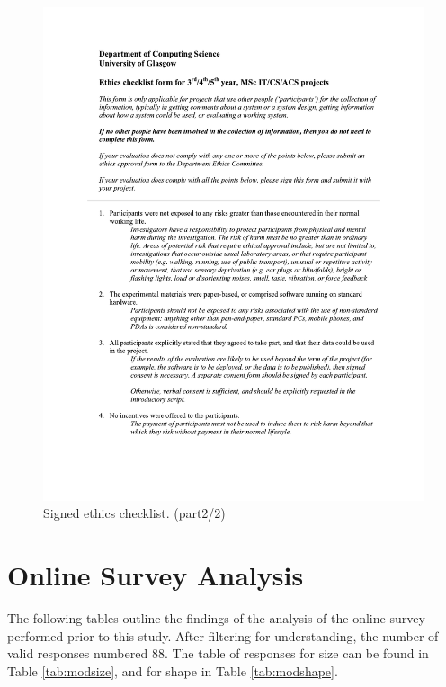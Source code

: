 \documentclass{l4proj}
\begin{document}
\begin{appendices}
\begin{figure}
    \includegraphics[page=2,width=\linewidth]{Appendices/ethics_form_KM.pdf}
    \caption{Signed ethics checklist. (part2/2)}
    \label{fig:ethics2}
\end{figure}

\newpage

\chapter{Online Survey Analysis}
\label{sec:onlineana}

The following tables outline the findings of the analysis of the online survey performed prior to this study. After filtering for understanding, the number of valid responses numbered 88. The table of responses for size can be found in Table \ref{tab:modsize}, and for shape in Table \ref{tab:modshape}.


\end{appendices}
\end{document}
